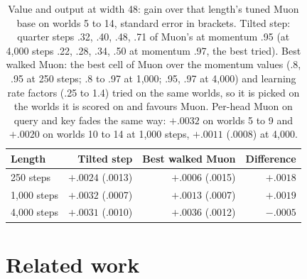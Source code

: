 \documentclass[11pt]{article}
\begin{document}
\begin{table}[t]
\centering
\begin{tabular}{lrrr}
\toprule
Length & Tilted step & Best walked Muon & Difference \\
\midrule
250 steps & $+.0024$ (.0013) & $+.0006$ (.0015) & $+.0018$ \\
1,000 steps & $+.0032$ (.0007) & $+.0013$ (.0007) & $+.0019$ \\
4,000 steps & $+.0031$ (.0010) & $+.0036$ (.0012) & $-.0005$ \\
\bottomrule
\end{tabular}
\caption{Value and output at width 48: gain over that length's tuned Muon base on worlds 5 to 14, standard error in brackets. Tilted step: quarter steps .32, .40, .48, .71 of Muon's at momentum .95 (at 4,000 steps .22, .28, .34, .50 at momentum .97, the best tried). Best walked Muon: the best cell of Muon over the momentum values (.8, .95 at 250 steps; .8 to .97 at 1,000; .95, .97 at 4,000) and learning rate factors (.25 to 1.4) tried on the same worlds, so it is picked on the worlds it is scored on and favours Muon. Per-head Muon on query and key fades the same way: $+.0032$ on worlds 5 to 9 and $+.0020$ on worlds 10 to 14 at 1,000 steps, $+.0011$ (.0008) at 4,000.}
\label{tab:tilt}
\end{table}


\section{Related work}
\end{document}
